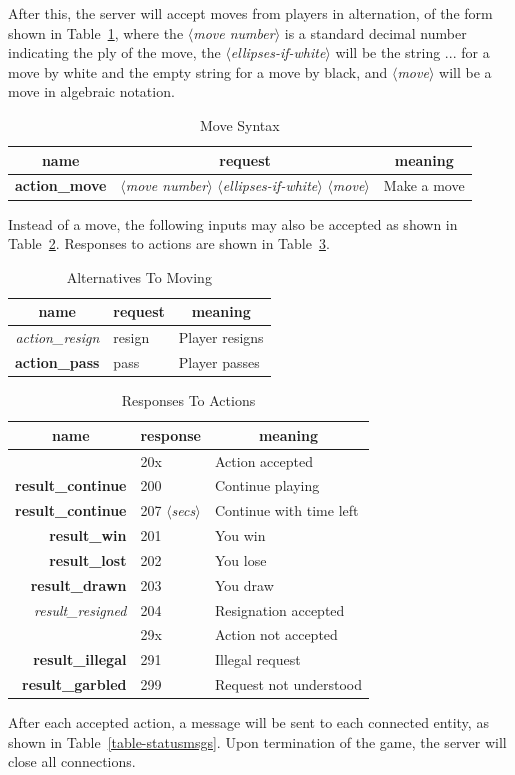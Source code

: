 \documentclass{article}
\newenvironment{reqtab}[2]{%
\begin{table}%
\centering
\caption{#2}%
\label{table-#1}%
\begin{tabular}{rll}%
\multicolumn{1}{c}{\bf name}&%
\multicolumn{1}{c}{\bf request}&%
\multicolumn{1}{c}{\bf meaning}\\\hline
}{\end{tabular}%
\end{table}}
\newenvironment{resptab}[2]{
\begin{table}%
\centering
\caption{#2}%
\label{table-#1}%
\begin{tabular}{rll}%
\multicolumn{1}{c}{\bf name}&%
\multicolumn{1}{c}{\bf response}&%
\multicolumn{1}{c}{\bf meaning}\\\hline
}{\end{tabular}%
\end{table}}
\newcommand{\stok}[1]{{$\langle${\em #1}$\rangle$}}
\newcommand{\bfid}[1]{{\bf #1}}
\newcommand{\itid}[1]{{\it #1}}
\begin{document}
After this, the server will accept moves from players
in alternation, of the form shown
in Table~\ref{table-moves},
where the \stok{move number} is a standard decimal number
indicating the ply of the move, the \stok{ellipses-if-white}
will be the string ... for a move by white and the
empty string for a move by black, and \stok{move} will be
a move in algebraic notation.

\begin{reqtab}{moves}{Move Syntax}
\bfid{action\_move} & \stok{move number} \stok{ellipses-if-white} \stok{move}
  & Make a move
\end{reqtab}

Instead of a move, the following inputs may
also be 
accepted as shown in Table~\ref{table-altmovereq}.
Responses to actions are shown in Table~\ref{table-altmoveresp}.

\begin{reqtab}{altmovereq}{Alternatives To Moving}
\itid{action\_resign}    & resign & Player resigns \\
\bfid{action\_pass}      & pass   & Player passes \\
\end{reqtab}

\begin{resptab}{altmoveresp}{Responses To Actions}
                        & 20x & Action accepted \\
\bfid{result\_continue} & 200 & Continue playing \\
\bfid{result\_continue} & 207 \stok{secs} & Continue with time left \\
\bfid{result\_win}      & 201 & You win \\
\bfid{result\_lost}     & 202 & You lose \\
\bfid{result\_drawn}    & 203 & You draw \\
\itid{result\_resigned} & 204 & Resignation accepted \\
                        & 29x & Action not accepted \\
\bfid{result\_illegal}  & 291 & Illegal request \\
\bfid{result\_garbled}  & 299 & Request not understood
\end{resptab}

After each accepted action, a message will
be sent to each connected entity, as
shown in Table~\ref{table-statusmsgs}.
Upon termination of the game, the server will close all
connections.
\end{document}
